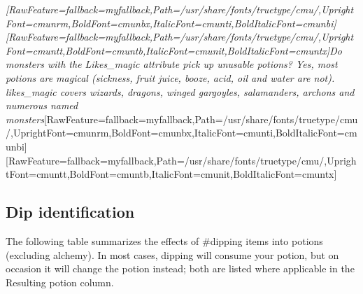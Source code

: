 {\itshape \allowbreak{}\setmainfont{cmunti.ttf}[RawFeature={fallback=myfallback},Path=/usr/share/fonts/truetype/cmu/,UprightFont=cmunrm,BoldFont=cmunbx,ItalicFont=cmunti,BoldItalicFont=cmunbi]\setmonofont{cmunti.ttf}[RawFeature={fallback=myfallback},Path=/usr/share/fonts/truetype/cmu/,UprightFont=cmuntt,BoldFont=cmuntb,ItalicFont=cmunit,BoldItalicFont=cmuntx]\itshape {}Do monsters with the Likes\_magic attribute pick up unusable potions?  Yes, most potions are magical (sickness, fruit juice, booze, acid, oil and water are not).  likes\_magic covers wizards, dragons, winged gargoyles, salamanders, archons and numerous named monsters}\allowbreak{}\setmainfont{cmunrm.ttf}[RawFeature={fallback=myfallback},Path=/usr/share/fonts/truetype/cmu/,UprightFont=cmunrm,BoldFont=cmunbx,ItalicFont=cmunti,BoldItalicFont=cmunbi]\setmonofont{cmunrm.ttf}[RawFeature={fallback=myfallback},Path=/usr/share/fonts/truetype/cmu/,UprightFont=cmuntt,BoldFont=cmuntb,ItalicFont=cmunit,BoldItalicFont=cmuntx]




\subsection{Dip identification}
\label{5}
The following table summarizes the effects of \#dipping\footnotemark[96] items into potions (excluding alchemy). In most cases, dipping will consume your potion, but on occasion it will change the potion instead; both are listed where applicable in the Resulting potion column.




